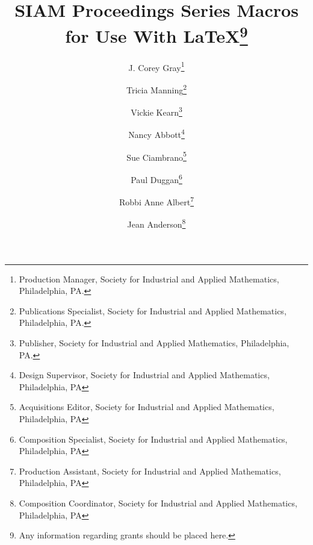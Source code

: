 




\cleardoublepage
\pagestyle{plain}

\title{SIAM Proceedings Series Macros
 for Use With LaTeX\thanks{Any information regarding grants should be placed 
here.}}
\author{J. Corey Gray\thanks{Production Manager, Society for Industrial and Applied 
Mathematics, Philadelphia, PA.}
\and 
Tricia Manning\thanks{Publications Specialist, Society for Industrial and Applied
Mathematics, Philadelphia, PA.}
\and
Vickie Kearn\thanks{Publisher, Society for Industrial and Applied Mathematics,
Philadelphia, PA.}\\
\and
Nancy Abbott\thanks{Design Supervisor, Society for Industrial and Applied 
Mathematics, Philadelphia, PA}
\and 
Sue Ciambrano\thanks{Acquisitions Editor, Society for Industrial and Applied 
Mathematics, Philadelphia, PA}
\and
Paul Duggan\thanks{Composition Specialist, Society for Industrial and Applied 
Mathematics, Philadelphia, PA}
\and
Robbi Anne Albert\thanks{Production Assistant, Society for Industrial and Applied 
Mathematics, Philadelphia, PA}
\and 
Jean Anderson\thanks{Composition Coordinator, Society for Industrial and Applied 
Mathematics, Philadelphia, PA}
}
\date{}
\maketitle

